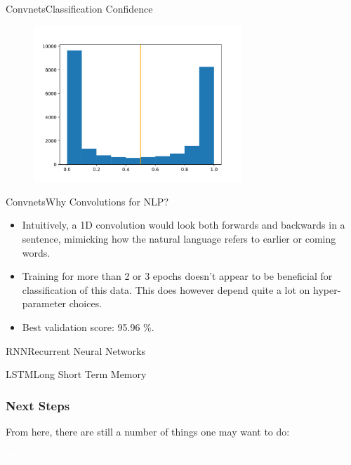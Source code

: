 \documentclass{beamer}
\begin{document}
\begin{frame}{Convnets}{Classification Confidence}

  \begin{figure}[ht]
    \centering
    \includegraphics[width=0.7\textwidth]{convnet_histogram}
  \end{figure}

\end{frame}

\begin{frame}{Convnets}{Why Convolutions for NLP?}

  \begin{itemize}

  \item Intuitively, a 1D convolution would look both forwards and backwards in
    a sentence, mimicking how the natural language refers to earlier or coming
    words.

  \item Training for more than 2 or 3 epochs doesn't appear to be beneficial for
    classification of this data. This does however depend quite a lot on
    hyper-parameter choices.

  \item Best validation score: 95.96 \%.

  \end{itemize}

\end{frame}



\begin{frame}{RNN}{Recurrent Neural Networks}

\end{frame}

\begin{frame}{LSTM}{Long Short Term Memory}

\end{frame}


\begin{frame}
  \frametitle{Next Steps}
  From here, there are still a number of things one may want to do:
\end{frame}

\bgroup
{}
\begin{frame}[t,plain]{}{}
  \begin{center}
    {\tiny \textcolor{white}{The End}}
  \end{center}
\end{frame}
\egroup
\end{document}

